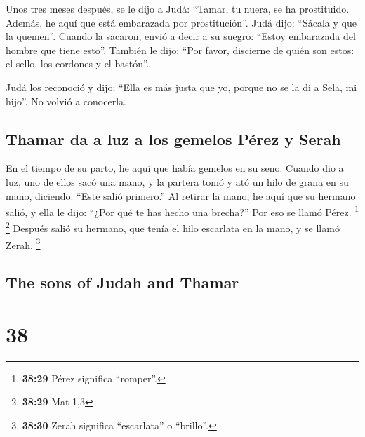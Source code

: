 \begin{paracol}{2}
 Unos tres meses después, se le dijo a Judá: ``Tamar, tu
nuera, se ha prostituido. Además, he aquí que está embarazada por
prostitución''. Judá dijo: ``Sácala y que la quemen''. 
Cuando la sacaron, envió a decir a su suegro: ``Estoy embarazada del
hombre que tiene esto''. También le dijo: ``Por favor, discierne de
quién son estos: el sello, los cordones y el bastón''.

 Judá los reconoció y dijo: ``Ella es más justa que yo,
porque no se la di a Sela, mi hijo''. No volvió a conocerla.

\hypertarget{thamar-da-a-luz-a-los-gemelos-puxe9rez-y-serah}{%
\subsection{Thamar da a luz a los gemelos Pérez y
Serah}\label{thamar-da-a-luz-a-los-gemelos-puxe9rez-y-serah}}

 En el tiempo de su parto, he aquí que había gemelos en
su seno.  Cuando dio a luz, uno de ellos sacó una mano, y
la partera tomó y ató un hilo de grana en su mano, diciendo: ``Este
salió primero.''  Al retirar la mano, he aquí que su
hermano salió, y ella le dijo: ``¿Por qué te has hecho una brecha?'' Por
eso se llamó Pérez. \footnote{\textbf{38:29} Pérez significa ``romper''.}
\footnote{\textbf{38:29} Mat 1,3}  Después salió su
hermano, que tenía el hilo escarlata en la mano, y se llamó Zerah.
\footnote{\textbf{38:30} Zerah significa ``escarlata'' o ``brillo''.}

\switchcolumn
\begin{otherlanguage}{english}

\hypertarget{the-sons-of-judah-and-thamar}{%
\subsection{The sons of Judah and
Thamar}\label{the-sons-of-judah-and-thamar}}

\hypertarget{section-75}{%
\section{38}\label{section-75}}


\end{otherlanguage}
\end{paracol}
